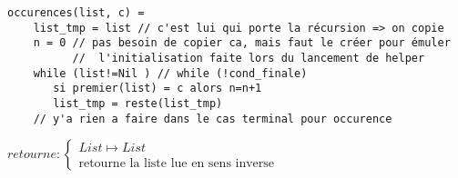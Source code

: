 \documentclass[10pt]{article}\usepackage[correction]{esial}
\begin{document}
\begin{Reponse}
\begin{itemize}
  \end{itemize}
  
  \begin{Verbatim}[label=occurences(list\quotesinglbase c) itérative]
  occurences(list, c) = 
    list_tmp = list // c'est lui qui porte la récursion => on copie
    n = 0 // pas besoin de copier ca, mais faut le créer pour émuler
          //  l'initialisation faite lors du lancement de helper
    while (list!=Nil ) // while (!cond_finale) 
       si premier(list) = c alors n=n+1
       list_tmp = reste(list_tmp)
    // y'a rien a faire dans le cas terminal pour occurence
  \end{Verbatim}
\end{Reponse}

\begin{Question}
  $retourne: \left\{
    \begin{array}{l}
      List\mapsto List\\
      \text{retourne la liste lue en sens inverse}
    \end{array}\right.$  
\end{Question}
\end{document}
